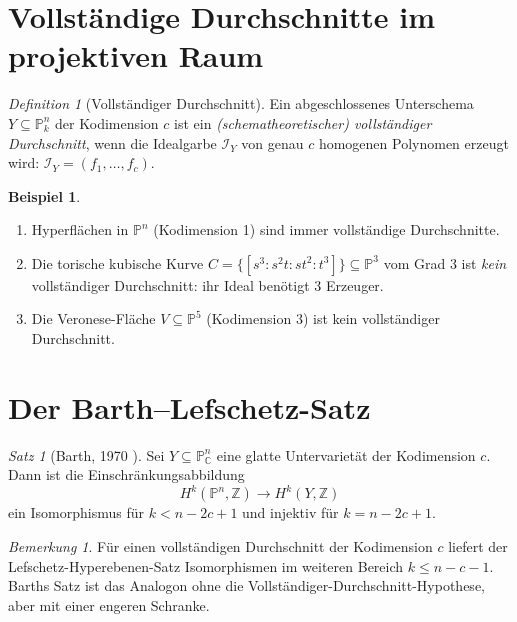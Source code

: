 \documentclass[12pt,a4paper]{amsart}
\theoremstyle{definition}
\newtheorem{example}[theorem]{Beispiel}
\theoremstyle{remark}
\newtheorem{satz}[theorem]{Satz}
\newtheorem{bemerkung}[theorem]{Bemerkung}
\newtheorem{definition_de}[theorem]{Definition}
\newcommand{\PP}{\mathbb{P}}
\newcommand{\ZZ}{\mathbb{Z}}
\newcommand{\CC}{\mathbb{C}}
\begin{document}
\section{Vollständige Durchschnitte im projektiven Raum}

\begin{definition_de}[Vollständiger Durchschnitt]
Ein abgeschlossenes Unterschema $Y \subseteq \PP^n_k$ der Kodimension $c$
ist ein \emph{(schematheoretischer) vollständiger Durchschnitt}, wenn die
Idealgarbe $\mathcal{I}_Y$ von genau $c$ homogenen Polynomen erzeugt wird:
$\mathcal{I}_Y = (f_1,\ldots,f_c)$.
\end{definition_de}

\begin{example}
\begin{enumerate}[label=(\roman*)]
  \item Hyperflächen in $\PP^n$ (Kodimension 1) sind immer vollständige
        Durchschnitte.
  \item Die torische kubische Kurve $C = \{[s^3:s^2t:st^2:t^3]\} \subseteq \PP^3$
        vom Grad 3 ist \emph{kein} vollständiger Durchschnitt:
        ihr Ideal benötigt 3 Erzeuger.
  \item Die Veronese-Fläche $V \subseteq \PP^5$ (Kodimension 3) ist kein
        vollständiger Durchschnitt.
\end{enumerate}
\end{example}

\section{Der Barth--Lefschetz-Satz}

\begin{satz}[Barth, 1970 \cite{Barth1970}]
Sei $Y \subseteq \PP^n_\CC$ eine glatte Untervarietät der Kodimension $c$.
Dann ist die Einschränkungsabbildung
\[
  H^k(\PP^n, \ZZ) \longrightarrow H^k(Y, \ZZ)
\]
ein Isomorphismus für $k < n - 2c + 1$ und injektiv für $k = n - 2c + 1$.
\end{satz}

\begin{bemerkung}
Für einen vollständigen Durchschnitt der Kodimension $c$ liefert der
Lefschetz-Hyperebenen-Satz Isomorphismen im weiteren Bereich $k \le n - c - 1$.
Barths Satz ist das Analogon ohne die Vollständiger-Durchschnitt-Hypothese,
aber mit einer engeren Schranke.
\end{bemerkung}
\end{document}
